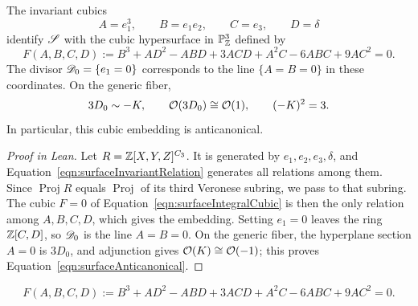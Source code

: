\begin{proposition}

\label{prop:surfaceIntegralCubic}


\leanok



 The invariant cubics \[ A=e_1^3,\qquad B=e_1e_2,\qquad C=e_3,\qquad D=\delta \] identify $\mathscr{S}$ with the cubic hypersurface in $\mathbb{P}^3_{\mathbb{Z}}$ defined by \begin{equation*} F(A,B,C,D):=B^3+AD^2-ABD+3ACD+A^2C-6ABC+9AC^2=0. \end{equation*} The divisor $\mathscr{D}_0=\{e_1=0\}$ corresponds to the line $\{A=B=0\}$ in these coordinates. On the generic fiber, \begin{equation*} 3D_0\sim-K,\qquad \mathcal{O}(3D_0)\cong\mathcal{O}(1),\qquad (-K)^2=3. \end{equation*} In particular, this cubic embedding is anticanonical. 

\end{proposition}

\begin{proof}[Proof in Lean]

\leanok


Let $R=\mathbb{Z}[X,Y,Z]^{C_3}$. It is generated by $e_1,e_2,e_3,\delta$, and Equation~\ref{eqn:surfaceInvariantRelation} generates all relations among them. Since $\operatorname{Proj}R$ equals $\operatorname{Proj}$ of its third Veronese subring, we pass to that subring. The cubic $F=0$ of Equation~\ref{eqn:surfaceIntegralCubic} is then the only relation among $A,B,C,D$, which gives the embedding. Setting $e_1=0$ leaves the ring $\mathbb{Z}[C,D]$, so $\mathscr{D}_0$ is the line $A=B=0$. On the generic fiber, the hyperplane section $A=0$ is $3D_0$, and adjunction gives $\mathcal{O}(K)\cong\mathcal{O}(-1)$; this proves Equation~\ref{eqn:surfaceAnticanonical}.

\end{proof}

\begin{equationnode}

\label{eqn:surfaceIntegralCubic}


\leanok



\begin{equation*} F(A,B,C,D):=B^3+AD^2-ABD+3ACD+A^2C-6ABC+9AC^2=0. \end{equation*}

\end{equationnode}

